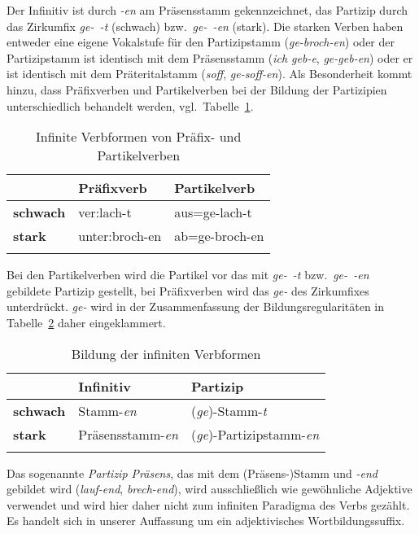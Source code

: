 Der Infinitiv ist durch \textit{-en} am Präsensstamm gekennzeichnet, das Partizip durch das Zirkumfix \textit{ge-~-t} (schwach) bzw.\ \textit{ge-~-en} (stark).
Die starken Verben haben entweder eine eigene Vokalstufe für den Partizipstamm (\textit{ge-broch-en}) oder der Partizipstamm ist identisch mit dem Präsensstamm (\textit{ich geb-e}, \textit{ge-geb-en}) oder er ist identisch mit dem Präteritalstamm (\textit{soff}, \textit{ge-soff-en}).
Als Besonderheit kommt hinzu, dass Präfixverben und Partikelverben bei der Bildung der Partizipien unterschiedlich behandelt werden, vgl.\ Tabelle~\ref{tab:ppvpart}.


\begin{table}
  \centering
  \begin{tabular}{lll}
    \lsptoprule
    & \textbf{Präfixverb} & \textbf{Partikelverb} \\
    \midrule
    \textbf{schwach} & ver:lach-t & aus=ge-lach-t \\
    \textbf{stark} & unter:broch-en & ab=ge-broch-en\\
    \lspbottomrule
  \end{tabular}
  \caption{Infinite Verbformen von Präfix- und Partikelverben}
  \label{tab:ppvpart}
\end{table}

Bei den Partikelverben wird die Partikel vor das mit \textit{ge-~-t} bzw.\ \textit{ge-~-en} gebildete Partizip gestellt, bei Präfixverben wird das \textit{ge-} des Zirkumfixes unterdrückt.
\textit{ge-} wird in der Zusammenfassung der Bildungsregularitäten in Tabelle~\ref{tab:vinf} daher eingeklammert.

\begin{table}
  \centering
  \begin{tabular}{lll}
    \lsptoprule
    & \textbf{Infinitiv} & \textbf{Partizip} \\
    \midrule
    \textbf{schwach} & Stamm-\textit{en} & (\textit{ge})-Stamm-\textit{t} \\
    \textbf{stark} & Präsensstamm-\textit{en} & (\textit{ge})-Partizipstamm-\textit{en} \\
    \lspbottomrule
  \end{tabular}
  \caption{Bildung der infiniten Verbformen}
  \label{tab:vinf}
\end{table}

Das sogenannte \textit{Partizip Präsens}, das mit dem (Präsens-)Stamm und \textit{-end} gebildet wird (\textit{lauf-end}, \textit{brech-end}), wird ausschließlich wie gewöhnliche Adjektive verwendet und wird hier daher nicht zum infiniten Paradigma des Verbs gezählt.
Es handelt sich in unserer Auffassung um ein adjektivisches Wortbildungssuffix.

